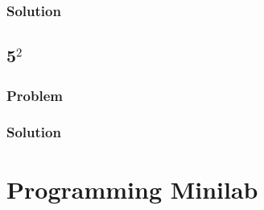 \documentclass[12pt]{article}
\begin{document}
\subsubsection*{Solution}
\todo[]

\subsection{5$^2$}
\subsubsection*{Problem}
\subsubsection*{Solution}
\todo[]

\section{Programming Minilab}
\todo[]
\end{document}
